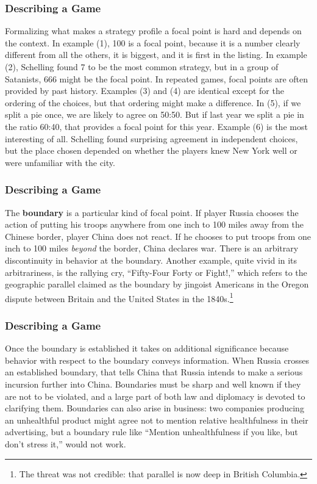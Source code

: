 \begin{frame}[fragile]\frametitle{Describing a Game}
Formalizing what makes a strategy profile a focal point is hard and depends on
the context. In  example (1), 100 is a focal point, because it is a number
clearly different from all the others, it is biggest, and it is first in the
listing.   In example (2), Schelling found 7 to be the most common strategy, but
in a group of Satanists, 666 might be the focal point. In repeated games, focal
points are often provided by past history.  Examples  (3) and (4) are identical
except for the ordering of the choices, but that ordering might make a
difference.  In (5),  if we split a pie once, we are likely to agree on 50:50.
But if last year we split a pie in the ratio 60:40, that provides a focal point
for this year.  Example (6) is the most interesting of all. Schelling found
surprising agreement in independent choices, but the place chosen depended on
whether the players knew New York well or were unfamiliar with the city.

\end{frame}
 \begin{frame}[fragile]\frametitle{Describing a Game}
 
   The {\bf boundary} is a particular kind of focal point.  If player Russia
chooses the action of putting his troops anywhere from one inch to 100 miles
away from the Chinese border, player China does not react. If he chooses to put
troops from one inch to 100 miles {\it beyond} the border, China declares war.
There is an arbitrary discontinuity in behavior at the boundary.  Another
example, quite vivid in its arbitrariness, is the rallying cry, ``Fifty-Four
Forty or Fight!,'' which refers to the geographic parallel claimed as the
boundary by jingoist Americans in the Oregon dispute between Britain and the
United States in the 1840s.\footnote{The threat was not credible: that parallel
is now deep in British Columbia.}

\end{frame}
 \begin{frame}[fragile]\frametitle{Describing a Game}
   Once the boundary is established  it takes on additional significance
because behavior with respect to the boundary conveys information.  When Russia
crosses an established boundary, that tells China that Russia intends to make a
serious incursion further into China. Boundaries must be sharp and well known if
they are not to be violated, and a large part of both law and diplomacy is
devoted to clarifying them. Boundaries can also arise in business: two companies
producing an unhealthful product might agree not to mention relative
healthfulness in their advertising, but a boundary rule like ``Mention
unhealthfulness if you like, but don't stress it,'' would not work.

\end{frame}
